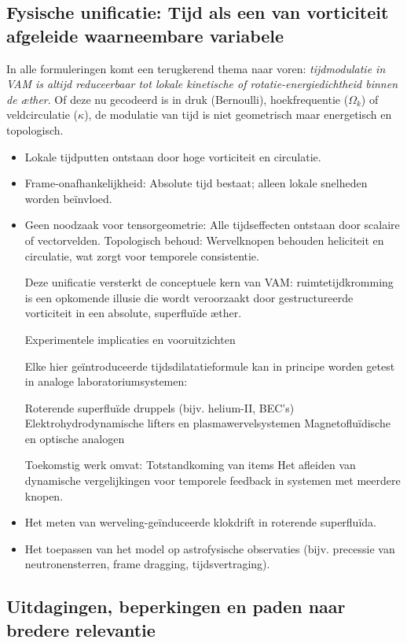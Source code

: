 \subsection{Fysische unificatie: Tijd als een van vorticiteit afgeleide waarneembare variabele}

In alle formuleringen komt een terugkerend thema naar voren: \textit{tijdmodulatie in VAM is altijd reduceerbaar tot lokale kinetische of rotatie-energiedichtheid binnen de æther}. Of deze nu gecodeerd is in druk (Bernoulli), hoekfrequentie (\( \Omega_k \)) of veldcirculatie (\( \kappa \)), de modulatie van tijd is niet geometrisch maar energetisch en topologisch.

\begin{itemize}
\item Lokale tijdputten ontstaan door hoge vorticiteit en circulatie.
\item Frame-onafhankelijkheid: Absolute tijd bestaat; alleen lokale snelheden worden beïnvloed.
\item Geen noodzaak voor tensorgeometrie: Alle tijdseffecten ontstaan door scalaire of vectorvelden.
Topologisch behoud: Wervelknopen behouden heliciteit en circulatie, wat zorgt voor temporele consistentie.

Deze unificatie versterkt de conceptuele kern van VAM: ruimtetijdkromming is een opkomende illusie die wordt veroorzaakt door gestructureerde vorticiteit in een absolute, superfluïde æther.

Experimentele implicaties en vooruitzichten

Elke hier geïntroduceerde tijdsdilatatieformule kan in principe worden getest in analoge laboratoriumsystemen:

Roterende superfluïde druppels (bijv. helium-II, BEC's)
Elektrohydrodynamische lifters en plasmawervelsystemen
Magnetofluïdische en optische analogen

Toekomstig werk omvat:
Totstandkoming van items
Het afleiden van dynamische vergelijkingen voor temporele feedback in systemen met meerdere knopen. \item Het meten van werveling-geïnduceerde klokdrift in roterende superfluïda.
\item Het toepassen van het model op astrofysische observaties (bijv. precessie van neutronensterren, frame dragging, tijdsvertraging).
\end{itemize}

\subsection{Uitdagingen, beperkingen en paden naar bredere relevantie}

